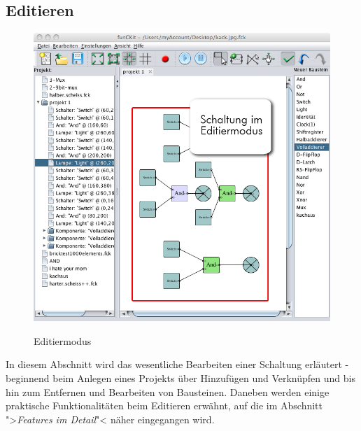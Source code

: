 \documentclass[12pt,a4paper]{scrartcl}
\begin{document}
\subsection{Editieren}
		\begin{figure}[H]
			\centering
			\includegraphics[width=\linewidth]{images/schaltungImEditiermodus.jpg}
			\label{fig:circuit-editmode}
			\caption{Editiermodus}
		\end{figure}
In diesem Abschnitt wird das wesentliche Bearbeiten einer Schaltung erläutert - beginnend beim Anlegen eines Projekts über Hinzufügen und Verknüpfen und bis hin zum Entfernen und Bearbeiten von Bausteinen. Daneben werden einige praktische Funktionalitäten beim Editieren erwähnt, auf die im Abschnitt ">\textit{Features im Detail}"< näher eingegangen wird.
\end{document}
